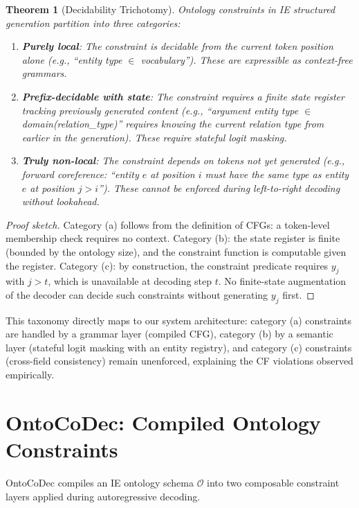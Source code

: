 \documentclass[11pt,a4paper]{article}
\newtheorem{theorem}{Theorem}
\begin{document}
\begin{theorem}[Decidability Trichotomy]
Ontology constraints in IE structured generation partition into three categories:
\begin{enumerate}[nosep,label=(\alph*)]
    \item \textbf{Purely local}: The constraint is decidable from the current token position alone (e.g., ``entity type $\in$ vocabulary''). These are expressible as context-free grammars.
    \item \textbf{Prefix-decidable with state}: The constraint requires a finite state register tracking previously generated content (e.g., ``argument entity type $\in$ domain(relation\_type)'' requires knowing the current relation type from earlier in the generation). These require stateful logit masking.
    \item \textbf{Truly non-local}: The constraint depends on tokens not yet generated (e.g., forward coreference: ``entity $e$ at position $i$ must have the same type as entity $e$ at position $j > i$''). These cannot be enforced during left-to-right decoding without lookahead.
\end{enumerate}
\end{theorem}

\begin{proof}[Proof sketch]
Category (a) follows from the definition of CFGs: a token-level membership check requires no context. Category (b): the state register is finite (bounded by the ontology size), and the constraint function is computable given the register. Category (c): by construction, the constraint predicate requires $y_j$ with $j > t$, which is unavailable at decoding step $t$. No finite-state augmentation of the decoder can decide such constraints without generating $y_j$ first.
\end{proof}

This taxonomy directly maps to our system architecture: category (a) constraints are handled by a grammar layer (compiled CFG), category (b) by a semantic layer (stateful logit masking with an entity registry), and category (c) constraints (cross-field consistency) remain unenforced, explaining the CF violations observed empirically.

\section{OntoCoDec: Compiled Ontology Constraints}

OntoCoDec compiles an IE ontology schema $\mathcal{O}$ into two composable constraint layers applied during autoregressive decoding.
\end{document}
